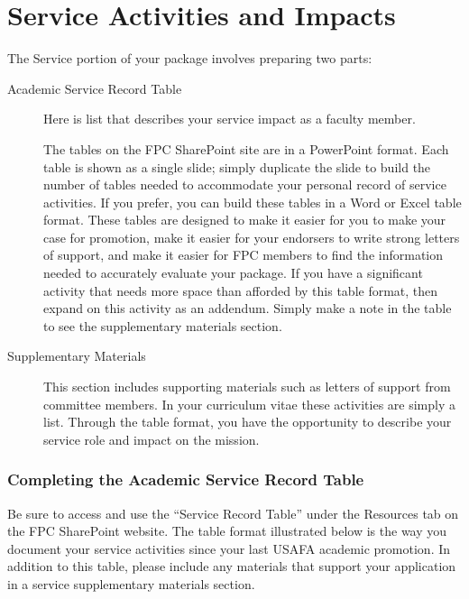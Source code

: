 \documentclass[11pt,titlepage]{article}
\begin{document}
\part{Service Activities and Impacts}  %

The Service portion of your package involves preparing two parts:
\begin{description}
  \item[Academic Service Record Table]
  Here is list that describes your service impact as a faculty member.

  The tables on the \gls{FPC} SharePoint site are in a PowerPoint format.
  Each table is shown as a single slide; simply duplicate the slide to build the number of tables needed to accommodate your personal record of service activities.
  If you prefer, you can build these tables in a Word or Excel table format.
  These tables are designed to make it easier for you to make your case for promotion, make it easier for your endorsers to write strong letters of support, and make it easier for \gls{FPC} members to find the information needed to accurately evaluate your package.
  If you have a significant activity that needs more space than afforded by this table format, then expand on this activity as an addendum.
  Simply make a note in the table to see the supplementary materials section.

  \item[Supplementary Materials]
  This section includes supporting materials such as letters of support from committee members.
  In your curriculum vitae these activities are simply a list.
  Through the table format, you have the opportunity to describe your service role and impact on the mission.
\end{description}

\section{Completing the Academic Service Record Table}  %
Be sure to access and use the ``Service Record Table'' under the Resources tab on the \gls{FPC} SharePoint website.
The table format illustrated below is the way you document your service activities since your last USAFA academic promotion.
In addition to this table, please include any materials that support your application in a service supplementary materials section.
\end{document}
